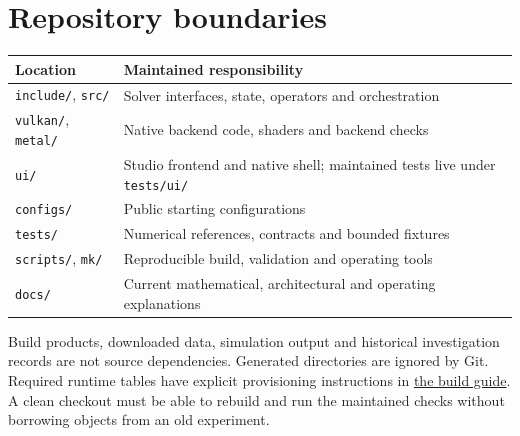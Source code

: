 \documentclass[
  11pt,
]{article}
\newcounter{none} %
\begin{document}
\section{Repository boundaries}\label{repository-boundaries}

{\def\LTcaptype{none} %
\begin{longtable}[]{@{}
  >{\raggedright\arraybackslash}p{}
  >{\raggedright\arraybackslash}p{}@{}}
\toprule\noalign{}
\begin{minipage}[b]{\linewidth}\raggedright
Location
\end{minipage} & \begin{minipage}[b]{\linewidth}\raggedright
Maintained responsibility
\end{minipage} \\
\midrule\noalign{}
\endhead
\bottomrule\noalign{}
\endlastfoot
\texttt{include/}, \texttt{src/} & Solver interfaces, state, operators
and orchestration \\
\texttt{vulkan/}, \texttt{metal/} & Native backend code, shaders and
backend checks \\
\texttt{ui/} & Studio frontend and native shell; maintained tests live under
\texttt{tests/ui/} \\
\texttt{configs/} & Public starting configurations \\
\texttt{tests/} & Numerical references, contracts and bounded
fixtures \\
\texttt{scripts/}, \texttt{mk/} & Reproducible build,
validation and operating tools \\
\texttt{docs/} & Current mathematical, architectural and operating
explanations \\
\end{longtable}
}

Build products, downloaded data, simulation output and historical
investigation records are not source dependencies. Generated directories
are ignored by Git. Required runtime tables have explicit provisioning
instructions in \href{BUILDING.md}{the build guide}. A clean
checkout must be able to rebuild and run the maintained checks without
borrowing objects from an old experiment.
\end{document}
